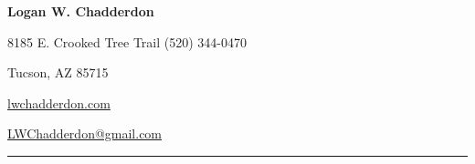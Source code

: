 \documentclass[11pt,letterpaper]{article}
\begin{document}
\begin{minipage}{\textwidth}

\begin{center}
\LARGE \bfseries Logan W. Chadderdon
\end{center}

8185 E. Crooked Tree Trail \hfill (520) 344-0470

\vspace{-3mm}
\begin{multicols}{3}
Tucson, AZ 85715 

{\centering \hfill \href{http://lwchadderdon.com}{lwchadderdon.com} \hfill}

\hfill \href{mailto:LWChadderdon@gmail.com}{LWChadderdon@gmail.com}

\end{multicols}






\vspace{-1mm}
\hrule


\end{minipage}
\end{document}
